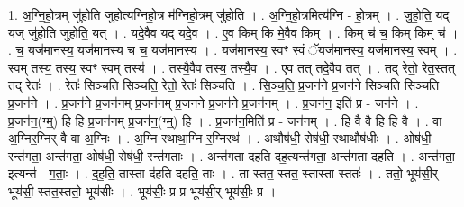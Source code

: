 \documentclass[17pt]{extarticle}
\begin{document}
1. अ॒ग्नि॒हो॒त्रम् जु॑होति जुहोत्यग्निहो॒त्र म॑ग्निहो॒त्रम् जु॑होति । . अ॒ग्नि॒हो॒त्रमित्य॑ग्नि - हो॒त्रम् । . जु॒हो॒ति॒ यद् यज् जु॑होति जुहोति॒ यत् । . यदे॒वैव यद् यदे॒व । . ए॒व किम् कि मे॒वैव किम् । . किम् च॑ च॒ किम् किम् च॑ । . च॒ यज॑मानस्य॒ यज॑मानस्य च च॒ यज॑मानस्य । . यज॑मानस्य॒ स्वꣳ स्वं ॅयज॑मानस्य॒ यज॑मानस्य॒ स्वम् । . स्वम् तस्य॒ तस्य॒ स्वꣳ स्वम् तस्य॑ । . तस्यै॒वैव तस्य॒ तस्यै॒व । . ए॒व तत् तदे॒वैव तत् । . तद् रेतो॒ रेत॒स्तत् तद् रेतः॑ । . रेतः॑ सिञ्चति सिञ्चति॒ रेतो॒ रेतः॑ सिञ्चति । . सि॒ञ्च॒ति॒ प्र॒जन॑ने प्र॒जन॑ने सिञ्चति सिञ्चति प्र॒जन॑ने । . प्र॒जन॑ने प्र॒जन॑नम् प्र॒जन॑नम् प्र॒जन॑ने प्र॒जन॑ने प्र॒जन॑नम् । . प्र॒जन॑न॒ इति॑ प्र - जन॑ने । . प्र॒जन॑न॒(ग्म्॒) हि हि प्र॒जन॑नम् प्र॒जन॑न॒(ग्म्॒) हि । . प्र॒जन॑न॒मिति॑ प्र - जन॑नम् । . हि वै वै हि हि वै । . वा अ॒ग्निर॒ग्निर् वै वा अ॒ग्निः । . अ॒ग्नि रथाथा॒ग्नि र॒ग्निरथ॑ । . अथौष॑धी॒ रोष॑धी॒ रथाथौष॑धीः । . ओष॑धी॒ रन्त॑गता॒ अन्त॑गता॒ ओष॑धी॒ रोष॑धी॒ रन्त॑गताः । . अन्त॑गता दहति दह॒त्यन्त॑गता॒ अन्त॑गता दहति । . अन्त॑गता॒ इत्यन्त॑ - ग॒ताः॒ । . द॒ह॒ति॒ तास्ता द॑हति दहति॒ ताः । . ता स्तत॒ स्तत॒ स्तास्ता स्ततः॑ । . ततो॒ भूय॑सी॒र् भूय॑सी॒ स्तत॒स्ततो॒ भूय॑सीः । . भूय॑सीः॒ प्र प्र भूय॑सी॒र् भूय॑सीः॒ प्र । \newline
\end{document}
